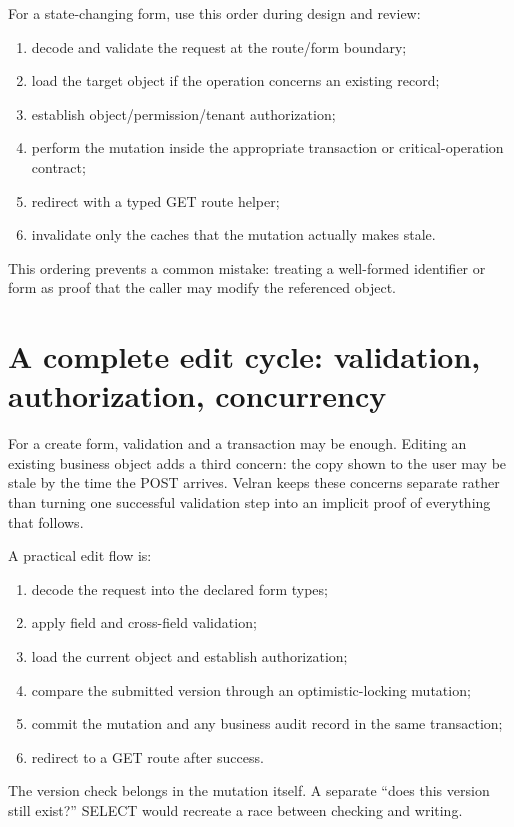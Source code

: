 For a state-changing form, use this order during design and review:

\begin{enumerate}
  \item decode and validate the request at the route/form boundary;
  \item load the target object if the operation concerns an existing record;
  \item establish object/permission/tenant authorization;
  \item perform the mutation inside the appropriate transaction or critical-operation contract;
  \item redirect with a typed GET route helper;
  \item invalidate only the caches that the mutation actually makes stale.
\end{enumerate}

This ordering prevents a common mistake: treating a well-formed identifier or form as proof that the caller may modify the referenced object.


\section{A complete edit cycle: validation, authorization, concurrency}

For a create form, validation and a transaction may be enough. Editing an existing business object adds a third concern: the copy shown to the user may be stale by the time the POST arrives. Velran keeps these concerns separate rather than turning one successful validation step into an implicit proof of everything that follows.

A practical edit flow is:

\begin{enumerate}
  \item decode the request into the declared form types;
  \item apply field and cross-field validation;
  \item load the current object and establish authorization;
  \item compare the submitted version through an optimistic-locking mutation;
  \item commit the mutation and any business audit record in the same transaction;
  \item redirect to a GET route after success.
\end{enumerate}

The version check belongs in the mutation itself. A separate ``does this version still exist?'' SELECT would recreate a race between checking and writing.

